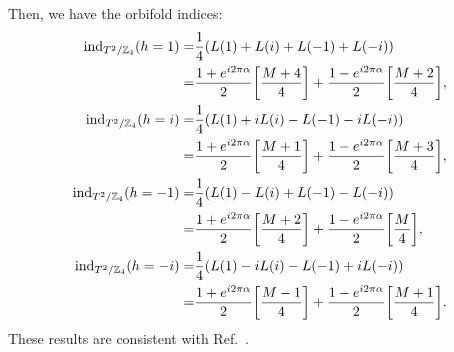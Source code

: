 \documentclass[11pt]{article}
\begin{document}
Then, we have the orbifold indices:
\begin{align}
\text{ind}_{T^2/{\mathbb{Z}_4}}(h=1 )=& \frac{1}{4}(L(1)+L(i) +L(-1) +L(-i)) 
 \nonumber \\
=& \frac{1 + e^{i2\pi \alpha }}{2}  \qty[\frac{M+4}{4}] + \frac{1 - e^{i2\pi \alpha }}{2}  \qty[\frac{M+2}{4}], \\
\text{ind}_{T^2/{\mathbb{Z}_4}}({ h=i})=& \frac{1}{4}(L(1)+iL(i) -L(-1) -iL(-i)) \nonumber \\
=& \frac{1 + e^{i2\pi \alpha }}{2}  \qty[\frac{M+1}{4}] + \frac{1 - e^{i2\pi \alpha }}{2}  \qty[\frac{M+3}{4}],\\
\text{ind}_{T^2/{\mathbb{Z}_4}}(h=-1 )=& \frac{1}{4}(L(1)-L(i) +L(-1) -L(-i)) \nonumber \\
=&\frac{1 + e^{i2\pi \alpha }}{2}  \qty[\frac{M+2}{4}] + \frac{1 - e^{i2\pi \alpha }}{2}  \qty[\frac{M}{4}],\\
\text{ind}_{T^2/{\mathbb{Z}_4}}({h=-i })=& \frac{1}{4}(L(1)-iL(i) -L(-1) +iL(-i)) \nonumber\\
=& \frac{1 + e^{i2\pi \alpha }}{2}  \qty[\frac{M-1}{4}] + \frac{1 - e^{i2\pi \alpha }}{2}  \qty[\frac{M+1}{4}].
\end{align}
These results are consistent with Ref.~\cite{Sakamoto:2020pev,Kobayashi:2022tti,Imai:2022bke}.
\end{document}
